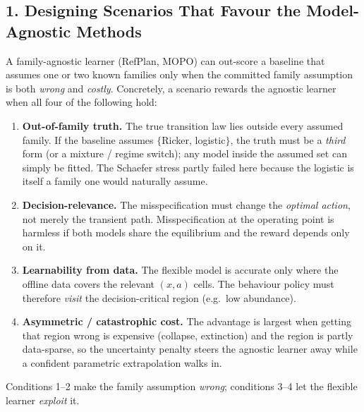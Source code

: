 \documentclass[11pt]{article}
\begin{document}
\subsection*{1. Designing Scenarios That Favour the Model-Agnostic Methods}
A family-agnostic learner (RefPlan, MOPO) can out-score a baseline that assumes one
or two known families only when the committed family assumption is both \emph{wrong}
and \emph{costly}. Concretely, a scenario rewards the agnostic learner when all four
of the following hold:
\begin{enumerate}
    \item \textbf{Out-of-family truth.} The true transition law lies outside every
    assumed family. If the baseline assumes $\{$Ricker, logistic$\}$, the truth must
    be a \emph{third} form (or a mixture / regime switch); any model inside the
    assumed set can simply be fitted. The Schaefer stress partly failed here because
    the logistic is itself a family one would naturally assume.
    \item \textbf{Decision-relevance.} The misspecification must change the
    \emph{optimal action}, not merely the transient path. Misspecification at the
    operating point is harmless if both models share the equilibrium and the reward
    depends only on it.
    \item \textbf{Learnability from data.} The flexible model is accurate only where
    the offline data covers the relevant $(x,a)$ cells. The behaviour policy must
    therefore \emph{visit} the decision-critical region (e.g.\ low abundance).
    \item \textbf{Asymmetric / catastrophic cost.} The advantage is largest when
    getting that region wrong is expensive (collapse, extinction) and the region is
    partly data-sparse, so the uncertainty penalty steers the agnostic learner away
    while a confident parametric extrapolation walks in.
\end{enumerate}
Conditions 1--2 make the family assumption \emph{wrong}; conditions 3--4 let the
flexible learner \emph{exploit} it.
\end{document}
